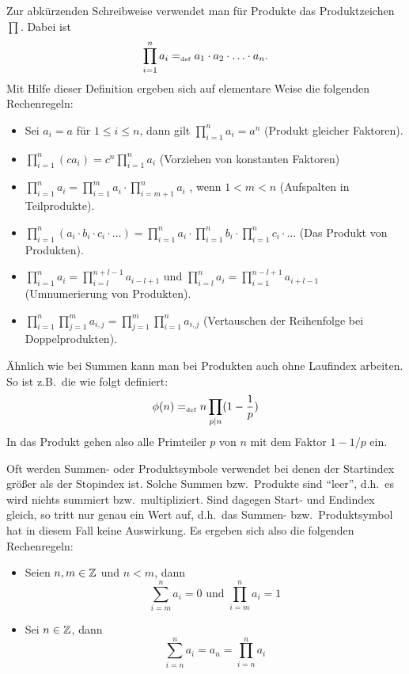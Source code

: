Zur abkürzenden Schreibweise verwendet man für Produkte das
Produktzeichen $\prod$\index{$\prod$}. Dabei ist
\begin{displaymath}
\prod_{i=1}^n a_i =_{\mathrm{\scriptscriptstyle def}} a_1 \cdot a_2 \cdot \ldots \cdot a_n.
\end{displaymath}
Mit Hilfe dieser Definition ergeben sich auf elementare Weise die
folgenden Rechenregeln:
\begin{itemize}
%
\item Sei $a_i = a$ für $1 \le i \le n$, dann gilt $\prod\limits_{i=1}^n a_i =
  a^n$ (Produkt gleicher Faktoren).
%
\item  $\prod\limits_{i=1}^n (c a_i) = c^n \prod\limits_{i=1}^n a_i$
  (Vorziehen von konstanten Faktoren)
%
\item $\prod\limits_{i=1}^n a_i = \prod\limits_{i=1}^m a_i \cdot
  \prod\limits_{i = m + 1}^n a_i$ , wenn $1 < m < n$ (Aufspalten in Teilprodukte).
%
\item $\prod\limits_{i=1}^n (a_i \cdot b_i \cdot c_i \cdot \ldots) =
  \prod\limits_{i=1}^n a_i \cdot \prod\limits_{i=1}^n b_i \cdot
  \prod\limits_{i=1}^n c_i \cdot \ldots$ (Das Produkt von Produkten).
%
\item $\prod\limits_{i=1}^n a_i = \prod\limits_{i=l}^{n + l - 1} a_{i-l+1}$
  und $\prod\limits_{i=l}^n a_i = \prod\limits_{i=1}^{n - l + 1} a_{i + l
  - 1}$
  (Umnumerierung von Produkten).
%
\item $\prod\limits_{i=1}^n \prod\limits_{j=1}^m a_{i,j} =
  \prod\limits_{j=1}^m \prod\limits_{i=1}^n a_{i,j}$ (Vertauschen der
  Reihenfolge bei Doppelprodukten).
%
\end{itemize}
Ähnlich wie bei Summen kann man bei Produkten auch ohne Laufindex arbeiten. So ist z.B.~die
 wie folgt definiert:
\begin{displaymath}
\phi(n) =_{\mathrm{\scriptscriptstyle def}} n \prod_{p \mid n} (1 - \frac{1}{p})
\end{displaymath}
In das Produkt gehen also alle Primteiler $p$ von $n$ mit dem Faktor $1 - 1/p$ ein.

Oft werden Summen- oder Produktsymbole verwendet bei denen der Startindex 
größer als der Stopindex ist. Solche Summen bzw.~Produkte sind "`leer"', 
d.h.~es wird nichts summiert bzw.~multipliziert. Sind dagegen Start- und
Endindex gleich, so tritt nur genau ein Wert auf, d.h.~das Summen- 
bzw.~Produktsymbol hat in diesem Fall keine Auswirkung. Es ergeben sich
also die folgenden Rechenregeln:
\begin{itemize}
%
\item Seien $n, m \in \mathbb Z$ und $n < m$, dann 
\begin{displaymath}
\sum_{i=m}^n a_i = 0  \text{ und } \prod_{i = m}^n a_i = 1
\end{displaymath}
%
\item Sei $n \in \mathbb Z$, dann 
\begin{displaymath}
\sum_{i=n}^n a_i = a_n = \prod_{i = n}^n a_i
\end{displaymath}
\end{itemize}



